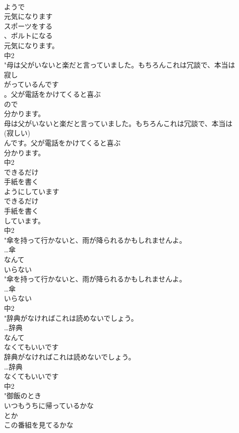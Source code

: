 \documentclass[8pt]{extreport}
\begin{document}
\begin{CJK}{UTF8}{min}
\\	ようで
\\	元気になります
\\	スポーツをする
\\	、ボルトになる
\\	元気になります。
\\	中2
\\	"母は父がいないと楽だと言っていました。もちろんこれは冗談で、本当は
\\	寂し
\\	がっているんです
\\	。父が電話をかけてくると喜ぶ
\\	ので
\\	分かります。
\\	母は父がいないと楽だと言っていました。もちろんこれは冗談で、本当は
\\	(寂しい)
\\	んです。父が電話をかけてくると喜ぶ
\\	分かります。
\\	中2
\\	できるだけ
\\	手紙を書く
\\	ようにしています
\\	できるだけ
\\	手紙を書く
\\	しています。
\\	中2
\\	"傘を持って行かないと、雨が降られるかもしれませんよ。
\\	…傘
\\	なんて
\\	いらない
\\	"傘を持って行かないと、雨が降られるかもしれませんよ。
\\	…傘
\\	いらない
\\	中2
\\	"辞典がなければこれは読めないでしょう。
\\	…辞典
\\	なんて
\\	なくてもいいです
\\	辞典がなければこれは読めないでしょう。
\\	…辞典
\\	なくてもいいです
\\	中2
\\	"御飯のとき
\\	いつもうちに帰っているかな
\\	とか
\\	この番組を見てるかな

\end{CJK}
\end{document}
